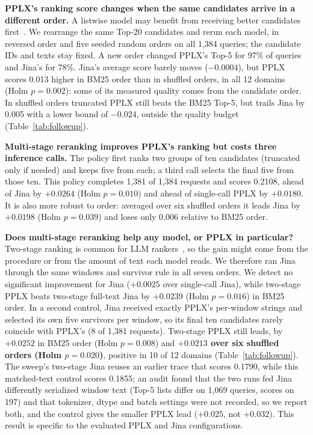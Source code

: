 \documentclass[conference]{IEEEtran}
\begin{document}
{

\textbf{PPLX's ranking score changes when the same candidates arrive in a different order.} A listwise model may benefit from receiving better candidates first~\cite{tang2024found,zheng2024mcq}. We rearrange the same Top-20 candidates and rerun each model, in reversed order and five seeded random orders on all 1,384 queries; the candidate IDs and texts stay fixed. A new order changed PPLX's Top-5 for 97\% of queries and Jina's for 78\%. Jina's average score barely moves ($-0.0004$), but PPLX scores 0.013 higher in BM25 order than in shuffled orders, in all 12 domains (Holm $p=0.002$): some of its measured quality comes from the candidate order. In shuffled orders truncated PPLX still beats the BM25 Top-5, but trails Jina by 0.005 with a lower bound of $-0.024$, outside the quality budget (Table~\ref{tab:followup}).

\textbf{Multi-stage reranking improves PPLX's ranking but costs three inference calls.} The policy first ranks two groups of ten candidates (truncated only if needed) and keeps five from each; a third call selects the final five from those ten. This policy completes 1,381 of 1,384 requests and scores 0.2108, ahead of Jina by $+0.0264$ (Holm $p=0.010$) and ahead of single-call PPLX by $+0.0180$. It is also more robust to order: averaged over six shuffled orders it leads Jina by $+0.0198$ (Holm $p=0.039$) and loses only 0.006 relative to BM25 order.

\textbf{Does multi-stage reranking help any model, or PPLX in particular?} Two-stage ranking is common for LLM rankers~\cite{sun2023rankgpt,zhuang2024setwise}, so the gain might come from the procedure or from the amount of text each model reads. We therefore ran Jina through the same windows and survivor rule in all seven orders. We detect no significant improvement for Jina ($+0.0025$ over single-call Jina), while two-stage PPLX beats two-stage full-text Jina by $+0.0239$ (Holm $p=0.016$) in BM25 order. In a second control, Jina received exactly PPLX's per-window strings and selected its own five survivors per window, so its final ten candidates rarely coincide with PPLX's (8 of 1,381 requests). Two-stage PPLX still leads, by $+0.0252$ in BM25 order (Holm $p=0.008$) and \textbf{$+0.0213$ over six shuffled orders (Holm $p=0.020$)}, positive in 10 of 12 domains (Table~\ref{tab:followup}). The sweep's two-stage Jina reuses an earlier trace that scores 0.1790, while this matched-text control scores 0.1855; an audit found that the two runs fed Jina differently serialized window text (Top-5 lists differ on 1,069 queries, scores on 197) and that tokenizer, dtype and batch settings were not recorded, so we report both, and the control gives the smaller PPLX lead ($+0.025$, not $+0.032$). This result is specific to the evaluated PPLX and Jina configurations.

}
\end{document}
